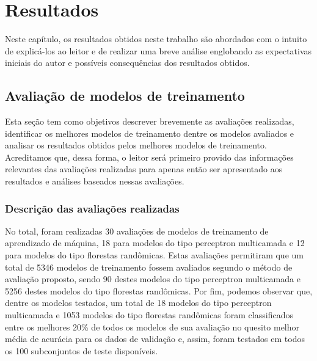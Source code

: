 \chapter{Resultados} \label{chap:resultados}

Neste capítulo, os resultados obtidos neste trabalho são abordados com o intuito de explicá-los ao leitor e de realizar uma breve análise englobando as expectativas iniciais do autor e possíveis consequências dos resultados obtidos.

\section{Avaliação de modelos de treinamento}

Esta seção tem como objetivos descrever brevemente as avaliações realizadas, identificar os melhores modelos de treinamento dentre os modelos avaliados e analisar os resultados obtidos pelos melhores modelos de treinamento. Acreditamos que, dessa forma, o leitor será primeiro provido das informações relevantes das avaliações realizadas para apenas então ser apresentado aos resultados e análises baseados nessas avaliações.

\subsection{Descrição das avaliações realizadas}

No total, foram realizadas 30 avaliações de modelos de treinamento de aprendizado de máquina, 18 para modelos do tipo perceptron multicamada e 12 para modelos do tipo florestas randômicas. Estas avaliações permitiram que um total de 5346 modelos de treinamento fossem avaliados segundo o método de avaliação proposto, sendo 90 destes modelos do tipo perceptron multicamada e 5256 destes modelos do tipo florestas randômicas. Por fim, podemos observar que, dentre os modelos testados, um total de 18 modelos do tipo perceptron multicamada e 1053 modelos do tipo florestas randômicas foram classificados entre os melhores 20\% de todos os modelos de sua avaliação no quesito melhor média de acurácia para os dados de validação e, assim, foram testados em todos os 100 subconjuntos de teste disponíveis.

